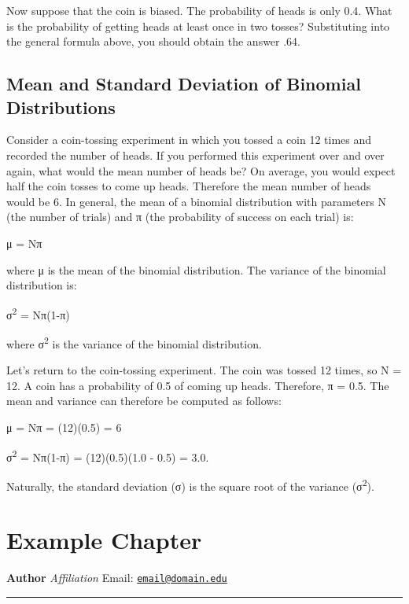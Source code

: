 \documentclass{book}
\begin{document}
Now suppose that the coin is biased. The probability of heads is only 0.4.
What is the probability of getting heads at least once in two tosses?
Substituting into the general formula above, you should obtain the answer .64.

\hypertarget{mean-and-standard-deviation-of-binomial-distributions}{%
\section{Mean and Standard Deviation of Binomial
Distributions}\label{mean-and-standard-deviation-of-binomial-distributions}}

Consider a coin-tossing experiment in which you tossed a coin 12 times and
recorded the number of heads. If you performed this experiment over and over
again, what would the mean number of heads be? On average, you would expect
half the coin tosses to come up heads. Therefore the mean number of heads
would be 6. In general, the mean of a binomial distribution with parameters N
(the number of trials) and π (the probability of success on each trial) is:

μ = Nπ

where μ is the mean of the binomial distribution. The variance of the binomial
distribution is:

σ\textsuperscript{2} = Nπ(1-π)

where σ\textsuperscript{2} is the variance of the binomial distribution.

Let's return to the coin-tossing experiment. The coin was tossed 12 times, so
N = 12. A coin has a probability of 0.5 of coming up heads. Therefore, π =
0.5. The mean and variance can therefore be computed as follows:

μ = Nπ = (12)(0.5) = 6

σ\textsuperscript{2} = Nπ(1-π) = (12)(0.5)(1.0 - 0.5) = 3.0.

Naturally, the standard deviation (σ) is the square root of the variance
(σ\textsuperscript{2}).

\hypertarget{example-chapter}{%
\chapter{Example Chapter}\label{example-chapter}}

\textbf{Author} \emph{Affiliation} Email:
\href{mailto:email@domain.edu}{\nolinkurl{email@domain.edu}}

\begin{center}\rule{0.5\linewidth}{0.5pt}\end{center}
\end{document}
